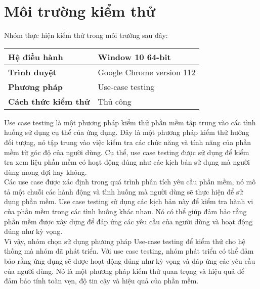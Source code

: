 \section{Môi trường kiểm thử}

\hspace*{0.5cm}Nhóm thực hiện kiểm thử trong môi trường sau đây:
\\
{
    \setlength\extrarowheight{6pt}
    \begin{longtable}{| p{} | p{} |}
        \hline
        \textbf{Hệ điều hành} & Window 10 64-bit \\
        \hline
        \textbf{Trình duyệt} & Google Chrome version 112\\
        \hline
        \textbf{Phương pháp} & Use-case testing\\
         \hline
        \textbf{Cách thức kiểm thử} & Thủ công\\
         \hline
    \end{longtable} 
}


Use case testing là một phương pháp kiểm thử phần mềm tập trung vào các tình huống sử dụng cụ thể của ứng dụng. Đây là một phương pháp kiểm thử hướng đối tượng, nó tập trung vào việc kiểm tra các chức năng và tính năng của phần mềm từ góc độ của người dùng. Cụ thể, use case testing được sử dụng để kiểm tra xem liệu phần mềm có hoạt động đúng như các kịch bản sử dụng mà người dùng mong đợi hay không.\\

Các use case được xác định trong quá trình phân tích yêu cầu phần mềm, nó mô tả một chuỗi các hành động và tình huống mà người dùng sẽ thực hiện để sử dụng phần mềm. Use case testing sử dụng các kịch bản này để kiểm tra hành vi của phần mềm trong các tình huống khác nhau. Nó có thể giúp đảm bảo rằng phần mềm được xây dựng để đáp ứng các yêu cầu của người dùng và hoạt động đúng như kỳ vọng.\\

Vì vậy, nhóm chọn sử dụng phương pháp Use-case testing để kiểm thử cho hệ thống mà nhóm đã phát triển. Với use case testing, nhóm phát triển có thể đảm bảo rằng ứng dụng sẽ được hoạt động đúng như kỳ vọng và đáp ứng các yêu cầu của người dùng. Nó là một phương pháp kiểm thử quan trọng và hiệu quả để đảm bảo tính toàn vẹn, độ tin cậy và hiệu quả của phần mềm.


